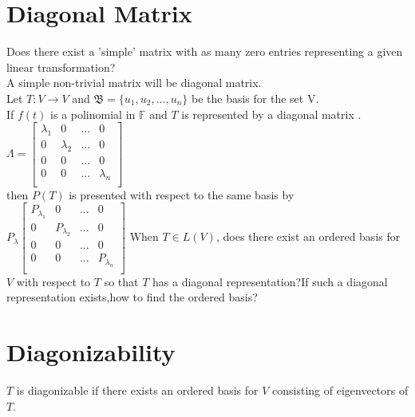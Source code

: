 \documentclass[12pt]{article}
\theoremstyle{definition}
\begin{document}
	  \section{Diagonal Matrix}
	  Does there exist a 'simple' matrix with as many zero entries representing a given linear transformation?\\
	  A simple non-trivial matrix will be diagonal matrix.\\
	  Let $ T:V\to V $ and $ \mathfrak{B} =\{u_{1},u_{2},...,u_{n}\} $ be the basis for the set V.\\
	  If $f(t)$ is a polinomial in $\mathbb{F}$ and $T$ is represented by a diagonal matrix . 
	  $
	  \Lambda =
	  \begin{bmatrix}
	  \lambda_{1} & 0 &... & 0 \\
	  0 & \lambda_2 & ... & 0 \\
	  0 & 0 & ... & 0 \\
	  0 & 0 & ... &  \lambda_n  \\
	  \end{bmatrix}
	  $
	  \\
	  then $P(T)$ is presented with respect to the same basis by 
	  $
	  P_{\lambda}
	  \begin{bmatrix}
	  P_{\lambda_{1}} & 0 &... & 0 \\
	  0 & P_{\lambda_2} & ... & 0 \\
	  0 & 0 & ... & 0 \\
	  0 & 0 & ... &  P_{\lambda_n}  \\
	  \end{bmatrix}
	  $
	  When $T \in L(V)$, does there exist an ordered basis for $V$ with respect to $T$ so that $T$ has a diagonal representation?If such a diagonal representation exists,how to find the ordered basis?\\
	  
	  \section{Diagonizability}
	  $T$ is diagonizable if there exists an ordered basis for $V$ consisting of eigenvectors of $T$.
\end{document}
